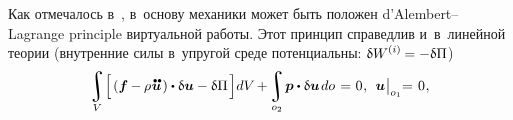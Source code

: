 \begin{otherlanguage}{russian}
Как отмечалось в~, в~основу механики может быть положен d’Alembert\hbox{--}Lagrange principle виртуальной работы. Этот принцип справедлив и~в~линейной теории (внутренние силы в~упругой среде потенциальны: ${\variation{\internalwork} = -\variation{\Pi}}$)
\vspace{0.1em}\begin{equation}\label{lineartheory:principleofvirtualwork}
\integral\displaylimits_V \hspace{-0.4ex} \left[^{\mathstrut} \hspace{-0.2ex} \left( \bm{f} \hspace{-0.1ex} - \hspace{-0.1ex} \rho \hspace{0.1ex} \mathdotdotabove{\bm{u}} \hspace{0.2ex} \right) \dotp \variation{\bm{u}} - \variation{\Pi} \hspace{0.25ex} \right] \hspace{-0.32ex} dV \hspace{-0.2ex} + \hspace{-0.2ex}
\integral\displaylimits_{o_2} \hspace{-0.25ex} \bm{p} \dotp \variation{\bm{u}} \hspace{0.25ex} do \hspace{0.2ex} = \hspace{0.1ex} 0 \hspace{0.1ex}, \:\: \bm{u} \hspace{0.1ex} \bigr|_{o_1} \hspace{-0.64ex} = \hspace{0.2ex} 0 \hspace{0.1ex},
\end{equation}


\end{otherlanguage}
